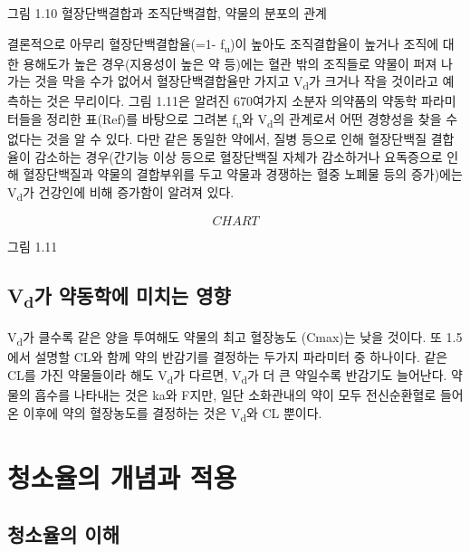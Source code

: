 \documentclass[
  11pt,
  krantz2, a4paper, twoside]{krantz}
\begin{document}
그림 1.10 혈장단백결합과 조직단백결합, 약물의 분포의 관계

결론적으로 아무리 혈장단백결합율(=1- f\textsubscript{u})이 높아도 조직결합율이 높거나
조직에 대한 용해도가 높은 경우(지용성이 높은 약 등)에는 혈관 밖의
조직들로 약물이 퍼져 나가는 것을 막을 수가 없어서 혈장단백결합율만
가지고 V\textsubscript{d}가 크거나 작을 것이라고 예측하는 것은 무리이다. 그림 1.11은
알려진 670여가지 소분자 의약품의 약동학 파라미터들을 정리한 표(Ref)를
바탕으로 그려본 f\textsubscript{u}와 V\textsubscript{d}의 관계로서 어떤 경향성을 찾을 수 없다는 것을
알 수 있다. 다만 같은 동일한 약에서, 질병 등으로 인해 혈장단백질
결합율이 감소하는 경우(간기능 이상 등으로 혈장단백질 자체가 감소하거나
요독증으로 인해 혈장단백질과 약물의 결합부위를 두고 약물과 경쟁하는 혈중
노폐물 등의 증가)에는 V\textsubscript{d}가 건강인에 비해 증가함이 알려져 있다.

{\[CHART\]}

그림 1.11

\hypertarget{vduxac00-uxc57duxb3d9uxd559uxc5d0-uxbbf8uxce58uxb294-uxc601uxd5a5}{%
\subsection{\texorpdfstring{V\textsubscript{d}가 약동학에 미치는 영향}{Vd가 약동학에 미치는 영향}}\label{vduxac00-uxc57duxb3d9uxd559uxc5d0-uxbbf8uxce58uxb294-uxc601uxd5a5}}

V\textsubscript{d}가 클수록 같은 양을 투여해도 약물의 최고 혈장농도 (Cmax)는 낮을
것이다. 또 1.5에서 설명할 CL와 함께 약의 반감기를 결정하는 두가지
파라미터 중 하나이다. 같은 CL를 가진 약물들이라 해도 V\textsubscript{d}가 다르면,
V\textsubscript{d}가 더 큰 약일수록 반감기도 늘어난다. 약물의 흡수를 나타내는 것은
ka와 F지만, 일단 소화관내의 약이 모두 전신순환혈로 들어온 이후에 약의
혈장농도를 결정하는 것은 V\textsubscript{d}와 CL 뿐이다.

\hypertarget{uxccaduxc18cuxc728uxc758-uxac1cuxb150uxacfc-uxc801uxc6a9}{%
\section{청소율의 개념과 적용}\label{uxccaduxc18cuxc728uxc758-uxac1cuxb150uxacfc-uxc801uxc6a9}}

\hypertarget{uxccaduxc18cuxc728uxc758-uxc774uxd574}{%
\subsection{청소율의 이해}\label{uxccaduxc18cuxc728uxc758-uxc774uxd574}}
\end{document}
